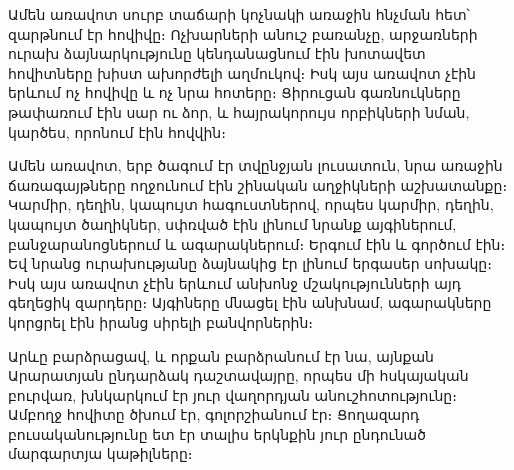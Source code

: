 \documentclass[12pt,a4paper]{article}
\begin{document}
Ամեն առավոտ սուրբ տաճարի կոչնակի առաջին հնչման հետ՝ զարթնում էր հովիվը։
Ոչխարների անուշ բառանչը, արջառների ուրախ ձայնարկությունը կենդանացնում էին
խոտավետ հովիտները խիստ ախորժելի աղմուկով։ Իսկ այս առավոտ չէին երևում ոչ հովիվը
և ոչ նրա հոտերը։ Ցիրուցան գառ\-նուկ\-նե\-րը թափառում էին սար ու ձոր, և
հայրակորույս որբիկների նման, կարծես, որոնում էին հովվին։

Ամեն առավոտ, երբ ծագում էր տվընջյան լուսատուն, նրա առաջին ճա\-ռա\-գայթ\-նե\-րը
ողջունում էին շինական աղջիկների աշխատանքը։ Կարմիր, դեղին, կապույտ
հագուստներով, որպես կարմիր, դեղին, կապույտ ծաղիկներ, սփռված էին լինում նրանք
այգիներում, բանջարանոցներում և ա\-գա\-րակ\-նե\-րում։ Երգում էին և գործում էին։
Եվ նրանց ուրախությանը ձայնակից էր լինում երգասեր սոխակը։ Իսկ այս առավոտ չէին
երևում անխոնջ մշա\-կու\-թյուն\-նե\-րի այդ գեղեցիկ զարդերը։ Այգիները մնացել էին
անխնամ, ա\-գա\-րակ\-նե\-րը կորցրել էին իրանց սիրելի բանվորներին։

Արևը բարձրացավ, և որքան բարձրանում էր նա, այնքան Արարատյան ընդարձակ
դաշտավայրը, որպես մի հսկայական բուրվառ, խնկարկում էր յուր վաղորդյան
անուշհոտությունը։ Ամբողջ հովիտը ծխում էր, գոլորշիանում էր։ Ցողազարդ
բուսականությունը ետ էր տալիս երկնքին յուր ընդունած մար\-գար\-տյա կաթիլները։
\end{document}
